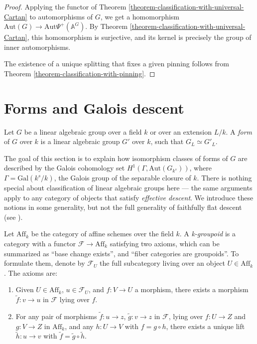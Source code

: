 \begin{proof}
 Applying the functor of Theorem \ref{theorem-classification-with-universal-Cartan} to automorphisms of $G$, we get a homomorphism
 $\text{Aut}(G) \to \text{Aut}\Psi^+(\mathbb A^G)$. By Theorem \ref{theorem-classification-with-universal-Cartan}, this homomorphism is surjective, and its kernel is precisely the group of inner automorphisms. 
 
 The existence of a unique splitting that fixes a given pinning follows from Theorem \ref{theorem-classification-with-pinning}.
\end{proof}



\section{Forms and Galois descent}
\label{section-forms-Galois-descent}

\begin{definition}
 \label{definition-forms}
Let $G$ be a linear algebraic group over a field $k$ or over an extension $L/k$. A {\it form} of $G$ over $k$ is a linear algebraic group $G'$ over $k$, such that $G_L\simeq G'_L$.
\end{definition}


The goal of this section is to explain how isomorphism classes of forms of $G$ are described by the Galois cohomology set $H^1(\Gamma, \text{Aut}(G_{k^s}))$, where $\Gamma = \text{Gal}(k^s/k)$, the Galois group of the separable closure of $k$. There is nothing special about classification of linear algebraic groups here --- the same arguments apply to any category of objects that satisfy \emph{effective descent}. We introduce these notions in some generality, but not the full generality of faithfully flat descent (see \cite[Tag 0238]{stacks-project}).

Let $\text{Aff}_k$ be the category of affine schemes over the field $k$. A \emph{k-groupoid} is a category with a functor $\mathcal F\to \text{Aff}_k$ satisfying two axioms, which can be summarized as ``base change exists'', and ``fiber categories are groupoids''. To formulate them, denote by $\mathcal F_U$ the full subcategory living over an object $U\in \text{Aff}_k$. The axioms are:
\begin{enumerate}
 \item Given $U\in \text{Aff}_k$, $u\in \mathcal F_U$, and $f:V\to U$ a morphism, there exists a morphism $\tilde f:v\to u$ in $\mathcal F$ lying over $f$.
 \item For any pair of morphisms $\tilde f: u\to z$, $\tilde g: v\to z$ in $\mathcal F$, lying over $f:U\to Z$ and $g:V\to Z$ in $\text{Aff}_k$, and any $h: U\to V$ with $f = g\circ h$, there exists a unique lift $\tilde h: u\to v$ with $\tilde f = \tilde g \circ \tilde h$.
\end{enumerate}

